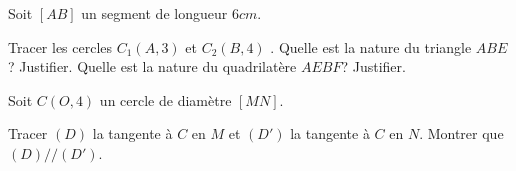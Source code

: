 \documentclass[a4paper,addpoints,12pt]{exam}
\begin{document}
\devoir[sem=2,prv=false,ds=false,num=6,niv=1 ,date=12/05/2023,Rdate=19/05/2023]












\begin{exo}
Soit $[AB]$ un segment de longueur $6cm$.
\begin{questions}
\question Tracer les cercles $C_1(A,3)$ et $C_2(B,4)$ .
\question Quelle est la nature du triangle $ABE$? Justifier.
\question Quelle est la nature du quadrilatère $AEBF$? Justifier.
\end{questions}
\end{exo}

\begin{exo}
Soit $C(O,4)$ un cercle de diamètre $[MN]$.
\begin{questions}
\question Tracer $(D)$ la tangente à $C$ en $M$ et $(D')$ la tangente à $C$ en $N$.
\question Montrer que $(D)//(D')$.
\end{questions}
\end{exo}
\end{document}
